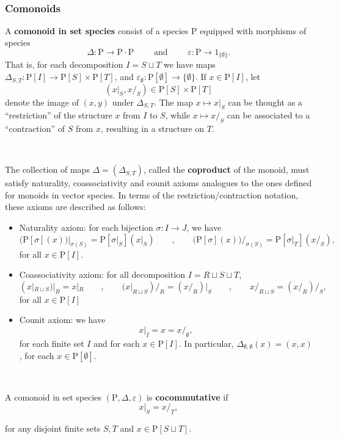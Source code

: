 \documentclass[12pt, reqno]{amsart}
\theoremstyle{definition}
\newcommand{\rP}{\mathrm{P}}
\begin{document}
\

\subsubsection{Comonoids}
A {\bf comonoid in set species} consist of a species $\rP$ equipped with morphisms of species
\[\Delta:\rP \to \rP \cdot \rP \qquad \text{ and } \qquad \varepsilon: \rP \to \mathrm{1}_{\{\emptyset \} }. \]
That is, for each decomposition $I=S \sqcup T$ we have maps $\Delta_{S,T}: \rP[I]\to \rP[S] \times \rP[T]$, and $\varepsilon_\emptyset: \rP[\emptyset] \to \{\emptyset\}$. If $x \in \rP[I]$,  let 
\[(x|_S, x /_S)\in \rP[S]\times \rP[T]\]
denote the image of $(x,y)$ under $\Delta_{S,T}$. The map $x \mapsto x|_S$ can be thought as a ``restriction'' of the structure $x$ from $I$ to $S$, while $x \mapsto x/_S$ can be associated to a ``contraction'' of $S$ from $x$, resulting in a structure on $T$.

\

The collection of maps $\Delta=(\Delta_{S,T})$, called the {\bf coproduct} of the monoid, must satisfy naturality, coassociativity and counit axioms analogues to the ones defined for monoids in vector species. In terms of the restriction/contraction notation, these axioms are described as follows:
\begin{itemize}
    \item Naturality axiom: for each bijection $\sigma: I \to J$,  we have
\[{\Big (}\rP[\sigma](x){\Big )}|_{\sigma(S)}=\rP[\sigma|_S](x|_S) \qquad , \qquad {\Big (}\rP[\sigma](x){\Big )}/_{\sigma(S)}=\rP[\sigma|_T](x/_S),\]
for all $x \in \rP[I]$.
\vspace{.1in}
\item Coassociativity axiom: for all decomposition $I=R \sqcup S \sqcup T$, \[(x|_{R\sqcup S})|_R=x|_R \qquad , \qquad (x|_{R\sqcup S})/_R=(x/_R)|_S \qquad , \qquad x/_{R \sqcup S}=(x/_R)/_S, \]
for all $x \in \rP[I]$
\vspace{.1in}
\item Counit axiom: we have
\[x|_I= x = x/_\emptyset,\]
for each finite set $I$ and for each $x \in \rP[I]$. In particular, $\Delta_{\emptyset, \emptyset}(x)=(x,x)$, for each $x \in \rP[\emptyset]$.
\end{itemize}

\


A comonoid in set species $(\rP, \Delta, \varepsilon)$ is {\bf cocommutative} if
\[x|_S=x/_T,\]

for any disjoint finite sets $S, T$ and $x \in \rP[S\sqcup T]$.
\end{document}
